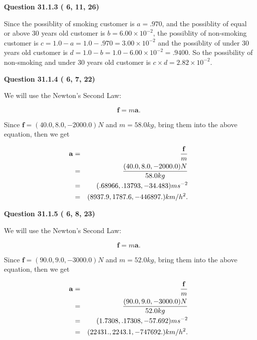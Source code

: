 \documentclass[12pt]{article}
\begin{document}
{\textbf{\Large{Question
31.1.3 
 (          6,         11,         26)
}}}
  
  
 
 

Since the possiblity of  %
smoking customer is $ a =  %
.970 $,
and the possiblity of  %
equal or above 30 years old customer is $ b =  %
6.00 \times 10^{-2} $,
the possiblity of  %
non-smoking customer is $ c = 1.0 - a = 1.0 -
.970
=  %
3.00 \times 10^{-2} $ and the possiblity of  %
under 30 years old
customer is $ d = 1.0 - b = 1.0 -  %
6.00 \times 10^{-2} =  %
.9400  $.
So the possibility of  %
 non-smoking and  %
under 30 years old
customer is $ c \times d =  %
2.82 \times 10^{-2} $.
 
 
 
  
\vspace{0.2in}
  
{\textbf{\Large{Question
31.1.4 
 (          6,          7,         22)
}}}
  
  
 
 

We will use the Newton's Second Law:
 
\[
\mathbf{f}=m\mathbf{a}.
\]
 
Since $\mathbf{f}=( %
40.0,  %
8.0,  %
-2000.0 )N$
and $m= %
58.0 kg$, bring them into the above equation, then we get
 
\begin{eqnarray*}
\mathbf{a}&=&\frac{\mathbf{f}}m  \\
&=&\frac{(
40.0 ,
8.0 ,
-2000.0 )N
}{ %
58.0 kg}  \\
&=&(
.68966 ,
.13793,
-34.483
)ms^{-2} \\
&=&(
8937.9 ,
1787.6 ,
-446897.
)km/h^2.
\end{eqnarray*}
 
 
 
  
\vspace{0.2in}
  
{\textbf{\Large{Question
31.1.5 
 (          6,          8,         23)
}}}
  
  
 
 

We will use the Newton's Second Law:
 
\[
\mathbf{f}=m\mathbf{a}.
\]
 
Since $\mathbf{f}=( %
90.0,  %
9.0,  %
-3000.0 )N$
and $m= %
52.0kg$, bring them into the above equation, then we get
 
\begin{eqnarray*}
\mathbf{a}&=&\frac{\mathbf{f}}m  \\
&=&\frac{(
90.0 ,
9.0 ,
-3000.0 )N
}{ %
52.0 kg}  \\
&=&(
1.7308 ,
.17308,
-57.692
)ms^{-2} \\
&=&(
22431. ,
2243.1 ,
-747692.
)km/h^2.
\end{eqnarray*}
 
\end{document}
